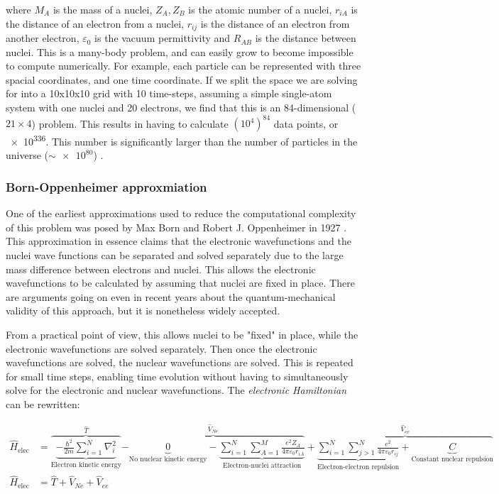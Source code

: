 where $M_A$ is the mass of a nuclei, $Z_A, Z_B$ is the atomic number
of a nuclei,
$r_{iA}$ is the distance of an electron from a nuclei, $r_{ij}$ is the distance
of an electron from another electron, $\varepsilon_0$ is the vacuum
permittivity and $R_{AB}$ is the distance
between nuclei. This is a many-body problem, and can easily grow to become
impossible to compute numerically. For example, each particle can be represented
with three spacial coordinates, and one time coordinate. If we split the space
we are solving for into a 10x10x10 grid with 10 time-steps, assuming a simple
single-atom system with one nuclei and 20 electrons, we find that this is an
84-dimensional ($21\times4$) problem. This results in having to
calculate $(10^4)^{84}$
data points, or \num{e336}. This number is significantly larger than the number
of particles in the universe ($\sim\num{e80}$) \cite{eddington}.

\subsubsection{Born-Oppenheimer approxmiation}

One of the earliest approximations used to reduce the computational complexity
of this problem was posed by Max Born and Robert J. Oppenheimer in
1927 \cite{born-oppenheimer}. This approximation in essence claims that
the electronic wavefunctions and the nuclei wave functions can be separated and
solved separately due to the large mass difference between electrons and
nuclei. This allows the electronic wavefunctions to be calculated by
assuming that nuclei are fixed in place. There are arguments going on
even in recent years about the quantum-mechanical validity of this approach,
but it is nonetheless widely accepted\cite{huggett}. \par

From a practical point of view, this allows nuclei to be "fixed" in place, while
the electronic wavefunctions are solved separately. Then once the electronic
wavefunctions are solved, the nuclear wavefunctions are solved. This
is repeated for small time steps, enabling time evolution without having to
simultaneously solve for the electronic and nuclear wavefunctions. The
\textit{electronic Hamiltonian} can be rewritten:

\begin{align}
  \hat H_{\text{elec}} &=
  \overbrace{\underbrace{
      -\frac{\hbar^2}{2m}\sum_{i=1}^N\nabla_i^2
  }_{\text{Electron kinetic energy}}}^{\hat T}
  \overbrace{- \underbrace{0}_{\text{No nuclear kinetic energy}} -
    \underbrace{\sum_{i=1}^N\sum_{A=1}^M \frac{e^2Z_A}{4\pi \varepsilon_0r_{iA}}
  }_{\text{Electron-nuclei attraction}}}^{\hat V_{Ne}} +
  \overbrace{\underbrace{\sum_{i = 1}^N \sum_{j > 1}^N
      \frac{e^2}{4\pi \varepsilon_0r_{ij}}
    }_{\text{Electron-electron repulsion}} +
  \underbrace{C}_{\text{Constant nuclear repulsion}}}^{\hat V_{ee}} \\
  \hat H_{\text{elec}} &= \hat T + \hat V_{Ne} + \hat V_{ee}
  \label{eq:electronic hamiltonian}
\end{align}

